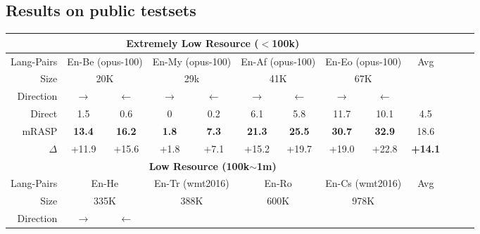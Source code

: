 \documentclass[11pt,a4paper]{article}
\newcommand{\mf}[1]{\multicolumn{2}{c}{ #1}}
\newcommand{\smf}[1]{\multicolumn{2}{c}{#1}}
\newcommand{\method}{mRASP\xspace}
\newcommand{\baseline}{Direct}
\begin{document}
\subsection{Results on public testsets}

\begin{table*}[htb]
\begin{center}
\begin{tabular}{rcccccccccccc}
\toprule
&\multicolumn{7}{c}{\textbf{Extremely Low Resource ($<$100k)}} \\
\midrule

Lang-Pairs& 
\mf{En-Be (opus-100)} &
\mf{En-My (opus-100)} &
\mf{En-Af (opus-100)} &
\mf{En-Eo (opus-100)} & 
Avg

\\



Size &
\smf{20K}  & 
\smf{29k}  & 
\smf{41K} & 
\smf{67K} & 

\\


Direction & 
 $\rightarrow$ &$\leftarrow$ &

 $\rightarrow$ &$\leftarrow$ &

 $\rightarrow$ &$\leftarrow$ &

 $\rightarrow$ &$\leftarrow$ \\




\midrule
\baseline &
1.5 & 0.6 & 0 & 0.2 &  6.1 & 5.8 & 11.7 & 10.1 & 4.5
\\


 \method &
\bf 13.4 & \bf 16.2 &
\bf 1.8 & \bf 7.3 &
\bf 21.3 & \bf 25.5 &
\bf 30.7 & \bf 32.9 &
18.6

\\

 $\Delta$ &
 +11.9 & +15.6 &
 +1.8 & +7.1  &
 +15.2 & +19.7 &
 +19.0 & +22.8 &
 \textbf{+14.1}

\\

\midrule
\midrule

&\multicolumn{7}{c}{\textbf{Low Resource (100k$\sim$1m)}} \\
\midrule


Lang-Pairs &
\mf{En-He} &
\mf{En-Tr (wmt2016)} &
\mf{En-Ro} &
\mf{En-Cs (wmt2016)} &
Avg
\\


Size &
\smf{335K} & 
\smf{388K} & 
\smf{600K} & 
\smf{978K}
\\


 Direction & 
 $\rightarrow$ &$\leftarrow$ &


\end{tabular}
\end{center}
\end{table*}
\end{document}
